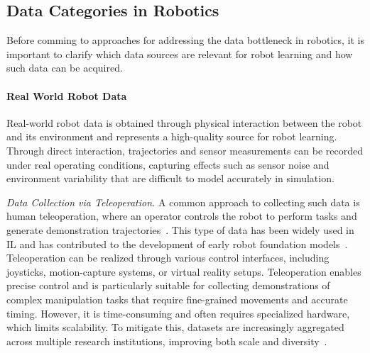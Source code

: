 \subsection{Data Categories in Robotics}
Before comming to approaches for addressing the data bottleneck in robotics, it is important to clarify which data sources are relevant for robot learning and how such data can be acquired.

\paragraph{Real World Robot Data}

	Real-world robot data is obtained through physical interaction between the robot and its environment and represents a high-quality source for robot learning. Through direct interaction, trajectories and sensor measurements can be recorded under real operating conditions, capturing effects such as sensor noise and environment variability that are difficult to model accurately in simulation.

	\textit{Data Collection via Teleoperation.} A common approach to collecting such data is human teleoperation, where an operator controls the robot to perform tasks and generate demonstration trajectories~\cite{Bousmalis2023RoboCatAS, Khazatsky2024DROIDAL, OpenXR}. This type of data has been widely used in \ac{IL} and has contributed to the development of early robot foundation models~\cite{Bousmalis2023RoboCatAS, Team2024OctoAO}. 
	Teleoperation can be realized through various control interfaces, including joysticks, motion-capture systems, or virtual reality setups. 
	Teleoperation enables precise control and is particularly suitable for collecting demonstrations of complex manipulation tasks that require fine-grained movements and accurate timing. However, it is time-consuming and often requires specialized hardware, which limits scalability. To mitigate this, datasets are increasingly aggregated across multiple research institutions, improving both scale and diversity~\cite{OpenXR}.

